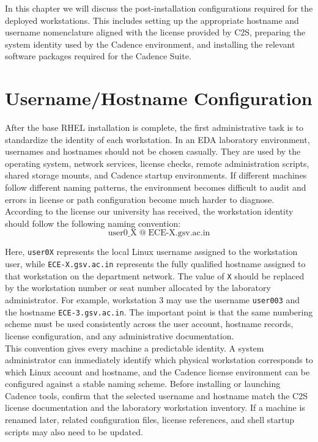 
In this chapter we will discuss the post-installation configurations required for the deployed workstations. This includes setting up the appropriate hostname and username nomenclature aligned with the license provided by C2S, preparing the system identity used by the Cadence environment, and installing the relevant software packages required for the Cadence Suite.

\section{Username/Hostname Configuration} 

After the base RHEL installation is complete, the first administrative task is to standardize the
identity of each workstation. In an EDA laboratory environment, usernames and hostnames should not
be chosen casually. They are used by the operating system, network services, license checks, remote
administration scripts, shared storage mounts, and Cadence startup environments. If different
machines follow different naming patterns, the environment becomes difficult to audit and errors in
license or path configuration become much harder to diagnose.\\

According to the license our university has received, the workstation identity should follow the
following naming convention:
\[
	\text{user0\_X} \; @ \; \text{ECE-X.gsv.ac.in}
\]

\noindent Here, \texttt{user0X} represents the local Linux username assigned to the workstation user, while
\texttt{ECE-X.gsv.ac.in} represents the fully qualified hostname assigned to that workstation on the
department network. The value of \texttt{X} should be replaced by the workstation number or seat number
allocated by the laboratory administrator. For example, workstation 3 may use the username
\texttt{user003} and the hostname \texttt{ECE-3.gsv.ac.in}. The important point is that the same numbering
scheme must be used consistently across the user account, hostname records, license configuration,
and any administrative documentation.\\

This convention gives every machine a predictable identity. A system administrator can immediately
identify which physical workstation corresponds to which Linux account and hostname, and the Cadence
license environment can be configured against a stable naming scheme. Before installing or launching
Cadence tools, confirm that the selected username and hostname match the C2S license documentation
and the laboratory workstation inventory. If a machine is renamed later, related configuration files,
license references, and shell startup scripts may also need to be updated.


